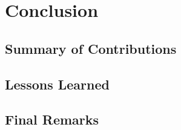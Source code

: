 \usepackage{lipsum}


\chapter{Conclusion} \label{cap:conclusion}


\section{Summary of Contributions}
\lipsum[1]


\section{Lessons Learned}
\lipsum[1]


\section{Final Remarks}
\lipsum[1]